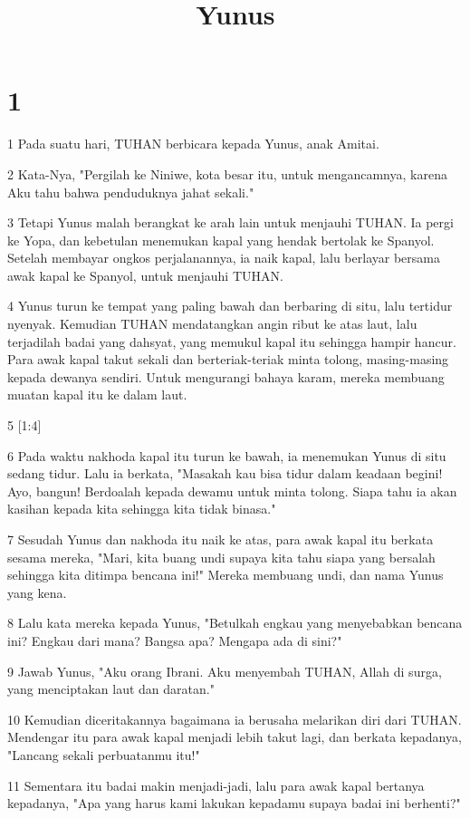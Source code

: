 

\title{Yunus}


\chapter{1}

\par 1 Pada suatu hari, TUHAN berbicara kepada Yunus, anak Amitai.
\par 2 Kata-Nya, "Pergilah ke Niniwe, kota besar itu, untuk mengancamnya, karena Aku tahu bahwa penduduknya jahat sekali."
\par 3 Tetapi Yunus malah berangkat ke arah lain untuk menjauhi TUHAN. Ia pergi ke Yopa, dan kebetulan menemukan kapal yang hendak bertolak ke Spanyol. Setelah membayar ongkos perjalanannya, ia naik kapal, lalu berlayar bersama awak kapal ke Spanyol, untuk menjauhi TUHAN.
\par 4 Yunus turun ke tempat yang paling bawah dan berbaring di situ, lalu tertidur nyenyak. Kemudian TUHAN mendatangkan angin ribut ke atas laut, lalu terjadilah badai yang dahsyat, yang memukul kapal itu sehingga hampir hancur. Para awak kapal takut sekali dan berteriak-teriak minta tolong, masing-masing kepada dewanya sendiri. Untuk mengurangi bahaya karam, mereka membuang muatan kapal itu ke dalam laut.
\par 5 [1:4]
\par 6 Pada waktu nakhoda kapal itu turun ke bawah, ia menemukan Yunus di situ sedang tidur. Lalu ia berkata, "Masakah kau bisa tidur dalam keadaan begini! Ayo, bangun! Berdoalah kepada dewamu untuk minta tolong. Siapa tahu ia akan kasihan kepada kita sehingga kita tidak binasa."
\par 7 Sesudah Yunus dan nakhoda itu naik ke atas, para awak kapal itu berkata sesama mereka, "Mari, kita buang undi supaya kita tahu siapa yang bersalah sehingga kita ditimpa bencana ini!" Mereka membuang undi, dan nama Yunus yang kena.
\par 8 Lalu kata mereka kepada Yunus, "Betulkah engkau yang menyebabkan bencana ini? Engkau dari mana? Bangsa apa? Mengapa ada di sini?"
\par 9 Jawab Yunus, "Aku orang Ibrani. Aku menyembah TUHAN, Allah di surga, yang menciptakan laut dan daratan."
\par 10 Kemudian diceritakannya bagaimana ia berusaha melarikan diri dari TUHAN. Mendengar itu para awak kapal menjadi lebih takut lagi, dan berkata kepadanya, "Lancang sekali perbuatanmu itu!"
\par 11 Sementara itu badai makin menjadi-jadi, lalu para awak kapal bertanya kepadanya, "Apa yang harus kami lakukan kepadamu supaya badai ini berhenti?"
